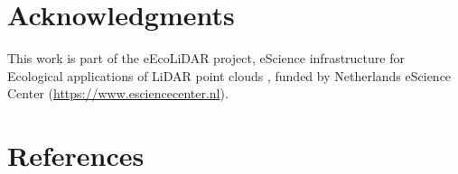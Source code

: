 \documentclass[review,authoryear,3p]{elsarticle}
\begin{document}
\linenumbers


\maketitle








\section*{Acknowledgments}
This work is part of the eEcoLiDAR project, eScience infrastructure for Ecological applications of LiDAR point clouds \citep{kissling2017eecolidar}, funded by Netherlands eScience Center (\url{https://www.esciencecenter.nl}).

\section*{References}


% 
\end{document}
